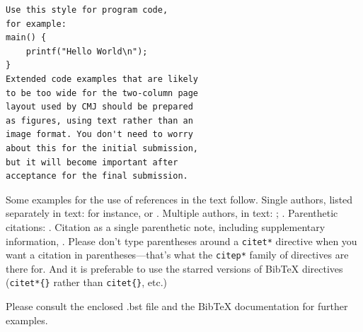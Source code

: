 \documentclass[letterpaper, 12pt]{article}
\begin{document}
%
\begin{Verbatim}[fontfamily=courier, xleftmargin=\parindent]
Use this style for program code, 
for example:
main() {
    printf("Hello World\n");    
}
Extended code examples that are likely
to be too wide for the two-column page
layout used by CMJ should be prepared
as figures, using text rather than an
image format. You don't need to worry
about this for the initial submission, 
but it will become important after 
acceptance for the final submission.
\end{Verbatim}

Some examples for the use of references in the text follow.
Single authors, listed separately in text: for instance, \citet*{Ano08} or \citet*{Bele68}.
Multiple authors, in text: \citet*{VeRo00}; \citet*{AtDa04}.
Parenthetic citations: \citep*{AtDa04, Ther99}.
Citation as a single parenthetic note, including supplementary information, \citep*[see also][which includes detailed diagrams]{Zica02}.
Please don't type parentheses around a \texttt{citet*{}} directive when you want a citation in parentheses---that's what the \texttt{citep*{}} family of directives are there for.
And it is preferable to use the starred versions of BibTeX directives (\texttt{citet*\{\}} rather than \texttt{citet\{\}}, etc.)

Please consult the enclosed .bst file and the BibTeX documentation for further examples. 




\end{document}
